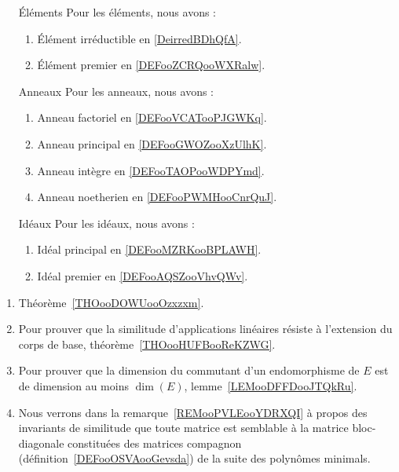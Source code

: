 \begin{enumerate}
    \item[Éléments]
        Pour les éléments, nous avons :
        \begin{enumerate}
            \item
                Élément irréductible en \ref{DeirredBDhQfA}.
            \item
                Élément premier en \ref{DEFooZCRQooWXRalw}.
        \end{enumerate}
    \item[Anneaux]
        Pour les anneaux, nous avons :
        \begin{enumerate}
            \item
                Anneau factoriel en \ref{DEFooVCATooPJGWKq}.
            \item
                Anneau principal en \ref{DEFooGWOZooXzUlhK}.
            \item
                Anneau intègre en \ref{DEFooTAOPooWDPYmd}.
            \item
                Anneau noetherien en \ref{DEFooPWMHooCnrQuJ}.
        \end{enumerate}
    \item[Idéaux]
        Pour les idéaux, nous avons :
        \begin{enumerate}
            \item
                Idéal principal en \ref{DEFooMZRKooBPLAWH}.
            \item
                Idéal premier en \ref{DEFooAQSZooVhvQWv}.
        \end{enumerate}
\end{enumerate}



    \begin{enumerate}
        \item
            Théorème~\ref{THOooDOWUooOzxzxm}.
        \item
            Pour prouver que la similitude d'applications linéaires résiste à l'extension du corps de base, théorème~\ref{THOooHUFBooReKZWG}.
        \item
            Pour prouver que la dimension du commutant d'un endomorphisme de \( E\) est de dimension au moins \( \dim(E)\), lemme~\ref{LEMooDFFDooJTQkRu}.
        \item
            Nous verrons dans la remarque~\ref{REMooPVLEooYDRXQI} à propos des invariants de similitude que toute matrice est semblable à la matrice bloc-diagonale constituées des matrices compagnon (définition~\ref{DEFooOSVAooGevsda}) de la suite des polynômes minimals.
        \end{enumerate}


